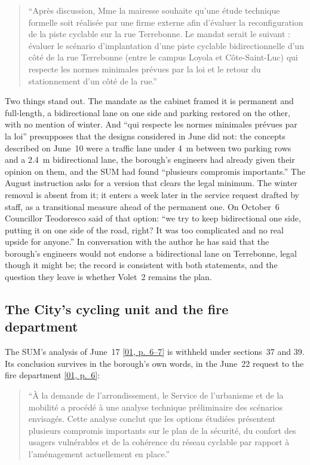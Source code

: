 \documentclass[11pt,letterpaper]{article}
\newcommand{\pagesurl}{https://openmobilitydata.github.io/Terrebonne-access-requests}
\newcommand{\pgl}[3]{\href{\pagesurl/\csname bundle#1\endcsname\#page=#2}{\textsf{\small[#1, p.~#3]}}}
\newcommand{\pg}[2]{\pgl{#1}{#2}{#2}}
\newcommand{\quot}[1]{\begin{quote}\small #1\end{quote}}
\begin{document}
\quot{``Apr\`es discussion, Mme la mairesse souhaite qu'une \'etude technique
formelle soit r\'ealis\'ee par une firme externe afin d'\'evaluer la
reconfiguration de la piste cyclable sur la rue Terrebonne. Le mandat serait
le suivant : \'evaluer le sc\'enario d'implantation d'une piste cyclable
bidirectionnelle d'un c\^ot\'e de la rue Terrebonne (entre le campus Loyola
et C\^ote-Saint-Luc) qui respecte les normes minimales pr\'evues par la loi
et le retour du stationnement d'un c\^ot\'e de la rue.''}

Two things stand out. The mandate as the cabinet framed it is permanent and
full-length, a bidirectional lane on one side and parking restored on the
other, with no mention of winter. And ``qui respecte les normes minimales
pr\'evues par la loi'' presupposes that the designs considered in June did
not: the concepts described on June~10 were a traffic lane under 4~m
between two parking rows and a 2.4~m bidirectional lane, the borough's
engineers had already given their opinion on them, and the SUM had found
``plusieurs compromis importants.'' The August instruction asks for a
version that clears the legal minimum. The winter removal is absent from it;
it enters a week later in the service request drafted by staff, as a
transitional measure ahead of the permanent one. On October~6 Councillor
Teodoresco said of that option: ``we try to keep bidirectional one side,
putting it on one side of the road, right? It was too complicated and no
real upside for anyone.'' In conversation with the author he has said that
the borough's engineers would not endorse a bidirectional lane on
Terrebonne, legal though it might be; the record is consistent with both
statements, and the question they leave is whether Volet~2 remains the
plan.

\subsection{The City's cycling unit and the fire department}

The SUM's analysis of June~17 \pgl{01}{6}{6--7} is withheld under sections~37
and 39. Its conclusion survives in the borough's own words, in the June~22
request to the fire department \pg{01}{6}:

\quot{``\`A la demande de l'arrondissement, le Service de l'urbanisme et de la
mobilit\'e a proc\'ed\'e \`a une analyse technique pr\'eliminaire des sc\'enarios
envisag\'es. Cette analyse conclut que les options \'etudi\'ees pr\'esentent
plusieurs compromis importants sur le plan de la s\'ecurit\'e, du confort des
usagers vuln\'erables et de la coh\'erence du r\'eseau cyclable par rapport \`a
l'am\'enagement actuellement en place.''}
\end{document}
